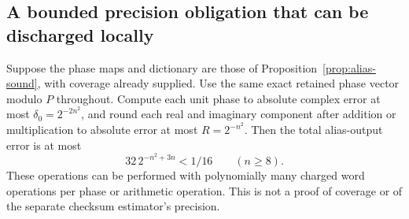 \subsection{A bounded precision obligation that can be discharged locally}
\begin{proposition}
\label{prop:alias-precision}
Suppose the phase maps and dictionary are those of
Proposition~\ref{prop:alias-sound}, with coverage already supplied.
Use the same exact retained phase vector modulo $P$ throughout.
Compute each unit phase to absolute complex error at most
$\delta_0=2^{-2n^2}$, and round each real and imaginary component
after addition or multiplication to absolute error at most
$R=2^{-n^2}$. Then the total alias-output error is at most
\[
 32\,2^{-n^2+3n}<1/16\qquad(n\ge8).
\]
These operations can be performed with polynomially many charged word
operations per phase or arithmetic operation. This is not a proof of
coverage or of the separate checksum estimator's precision.
\end{proposition}
